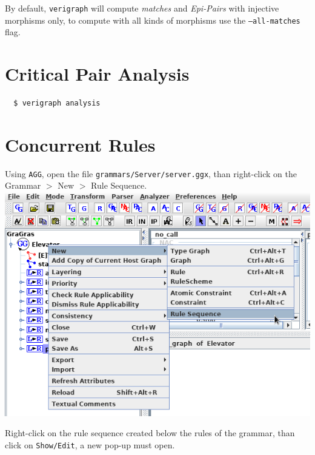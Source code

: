 \documentclass[12pt]{article}
\begin{document}
By default, \texttt{verigraph} will compute \textit{matches} and \textit{Epi-Pairs} with injective morphisms only, to compute with all kinds of morphisms use the \texttt{--all-matches} flag.

\section{Critical Pair Analysis}

\begin{verbatim}
  $ verigraph analysis
\end{verbatim}

\section{Concurrent Rules}

Using \texttt{AGG}, open the file \texttt{grammars/Server/server.ggx}, than right-click on the Grammar $>$ New $>$ Rule Sequence. \\

\noindent
\includegraphics[scale = 0.6]{rule-sequence_01.png}

Right-click on the rule sequence created below the rules of the grammar, than click on \texttt{Show/Edit}, a new pop-up must open.\\
\end{document}
